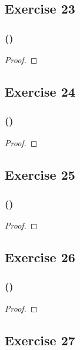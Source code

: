 \documentclass[14pt]{extarticle}
\begin{document}
\subsection{Exercise 23}

\subsubsection{()}

\begin{proof}

\end{proof}

\subsection{Exercise 24}

\subsubsection{()}

\begin{proof}

\end{proof}

\subsection{Exercise 25}

\subsubsection{()}

\begin{proof}

\end{proof}

\subsection{Exercise 26}

\subsubsection{()}

\begin{proof}

\end{proof}

\subsection{Exercise 27}
\end{document}
